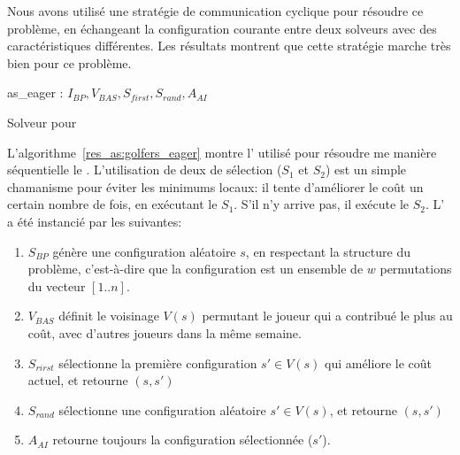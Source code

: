 Nous avons utilisé une stratégie de communication cyclique pour résoudre ce problème, en échangeant la configuration courante entre deux solveurs avec des caractéristiques différentes. Les résultats montrent que cette stratégie marche très bien pour ce problème.

\begin{algorithm}
\dontprintsemicolon
\SetNoline
{}
   as\_eager\;
\algoindent {} : $I_{BP}, V_{BAS}, S_{first}, S_{rand}, A_{AI}$ \;
\caption{Solveur pour \SGP}\label{res_as:golfers_eager}
\end{algorithm}

L'algorithme~\ref{res_as:golfers_eager} montre l'\as{} utilisé pour résoudre me manière séquentielle le \SGP{}. L'utilisation de deux \ms{} de sélection ($S_1$ et $S_2$) est un simple chamanisme pour éviter les minimums locaux: il tente d'améliorer le coût un certain nombre de fois, en exécutant le \om{} $S_1$. S'il n'y arrive pas, il exécute le \om{} $S_2$. L'\as{} a été instancié par les \oms{} suivantes:

\begin{enumerate}
\item $S_{BP}$ génère une configuration aléatoire $s$, en respectant la structure du problème, c'est-à-dire que la configuration est un ensemble de $w$ permutations du vecteur $[1..n]$.
\item $V_{BAS}$ définit le voisinage $V \left(s\right)$ permutant le joueur qui a contribué le plus au coût, avec d'autres joueurs dans la même semaine.
\item $S_{rirst}$ sélectionne la première configuration $s'\in V\left (s\right)$ qui améliore le coût actuel, et retourne $(s, s')$
\item $S_{rand}$ sélectionne une configuration aléatoire $s'\in V\left(s\right)$, et retourne $(s, s')$
\item $A_{AI}$ retourne toujours la configuration sélectionnée ($s'$).
\end{enumerate}

